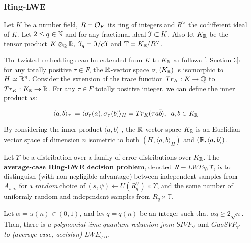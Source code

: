 \documentclass[a4paper,12pt]{article}
\begin{document}
\subsubsection{Ring-LWE}
\label{sec:orgcfd0ccf}
\begin{text}
  Let $K$ be a number field, $R = \mathcal{O}_K$ its ring of integers and $R^\vee$ the
  codifferent ideal of $K$. Let $2 \leq q \in \mathbb{N}$ and for any fractional ideal $\mathfrak{I} \subset
  K$. Also let $K_{\mathbb{R}}$ be the tensor product $K \otimes_{\mathbb{Q}} \mathbb{R}$, $\mathfrak{I}_q = \mathfrak{I}/q\mathfrak{I}$
  and $\mathbb{T} = K_{\mathbb{R}}/R^\vee$.

  The twisted embeddings can be extended from $K$ to $K_{\mathbb{R}}$ as follows [\cite{Ortiz2021},
  Section 3]: for any totally positive $\tau \in F$, the $\mathbb{R}$-vector space
  $\sigma_\tau(K_{\mathbb{R}})$ is isomorphic to $H \simeq \mathbb{R}^n$. Consider the extension of the trace
  function $Tr_K : K \rightarrow \mathbb{Q}$ to $Tr_K : K_{\mathbb{R}} \rightarrow \mathbb{R}$. For any $\tau \in F$ totally
  positive integer, we can define the inner product as:

  $$
  \langle{a,b}\rangle_\tau \vcentcolon = \langle{\sigma_\tau(a), \sigma_\tau(b)}\rangle_H  = Tr_K (\tau a \overline{b}) , \;\; a,b \in K_{\mathbb{R}}
  $$

  By considering the inner product $\langle{a,b}\rangle_\tau$, the $\mathbb{R}$-vector space $K_{\mathbb{R}}$
  is an Euclidian vector space of dimension $n$ isometric to both $\left(
    H , \langle{a,b}\rangle_H  \right)$ and $\left( \mathbb{R} , \langle{a,b}\rangle  \right)$.
\end{text}

\begin{definition}
  \label{definition:ring-lwe-decision}
  Let $\Upsilon$ be a distribution over a family of error distributions over $K_{\mathbb{R}}$.
  The \textbf{average-case Ring-LWE decision problem}, denoted $R-LWE{q,\Upsilon}$, is to
  distinguish (with non-negligible advantage) between independent samples from
  $A_{s, \psi}$ for a \textit{random} choice of $(s,\psi) \longleftarrow U(R_q^\vee) \times \Upsilon$, and the
  same number of uniformly random and independent samples from $R_q \times \mathbb{T}$.
\end{definition}

\begin{theorem}
  Let $\alpha = \alpha(n) \in (0, 1)$, and let $q = q(n)$ be an integer such that $\alpha q \geq 
  2\sqrt{n}$. Then, there is \emph{a polynomial-time quantum reduction from} $SIVP_{\gamma'}$
  and $GapSVP_{\gamma'}$ \emph{to (average-case, decision)} $LWE_{q,\alpha}$.
\end{theorem}
\end{document}
